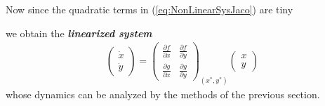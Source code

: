Now since the quadratic terms in (\ref{eq:NonLinearSysJaco}) are tiny 
\begin{comment}
	and, as stated before, $\begin{pmatrix}
		\dot x
		\\
		\dot y
	\end{pmatrix}
	=
	\begin{pmatrix}
		\dot u
		\\
		\dot v
	\end{pmatrix}$	
\end{comment}
we obtain the \textbf{\emph{linearized system}}
\begin{eqnarray}
	\begin{pmatrix}
		\dot x
		\\
		\dot y
	\end{pmatrix}
	=
	\begin{pmatrix}
		\frac{\partial f}{\partial x} & \frac{\partial f}{\partial y}
		\\
		\frac{\partial g}{\partial x} & \frac{\partial g}{\partial y}
	\end{pmatrix}_{(x^*,y^*)}
	\begin{pmatrix}
		x
		\\
		y
	\end{pmatrix}
\end{eqnarray}
whose dynamics can be analyzed by the methods of the previous section.
